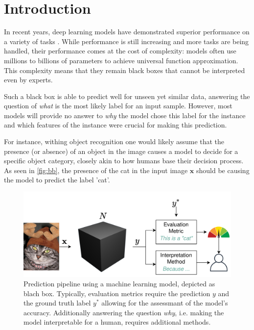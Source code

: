 \section{Introduction}
\label{sec:introduction}

In recent years, deep learning models have demonstrated superior performance on a variety of tasks \cite{ruede2020multi, brinker2019deep, nguyen2020super}. While performance is still increasing and more tasks are being handled, their performance comes at the cost of complexity: models often use millions to billions of parameters to achieve universal function approximation.
This complexity means that they remain black boxes that cannot be interpreted even by experts.

Such a black box is able to predict well for unseen yet similar data, answering the question of \textit{what} is the most likely label for an input sample. 
However, most models will provide no answer to \textit{why} the model chose this label for the instance and which features of the instance were crucial for making this prediction. 

For instance, withing object recognition one would likely assume that the presence (or absence) of an object in the image causes a model to decide for a specific object category, closely akin to how humans base their decision process. As seen in \autoref{fig:bb}, the presence of the cat in the input image $\mathbf{x}$ should be causing the model to predict the label 'cat'.  

\begin{figure}[t]
    \centering
    \includegraphics[width=\linewidth]{figures/bb.png}
    \caption{Prediction pipeline using a machine learning model, depicted as blach box. Typically, evaluation metrics require the prediction $y$ and the ground truth label $y^*$ allowing for the assessmant of the model's accuracy. Additionally answering the question \textit{why}, i.e. making the model interpretable for a human, requires additional methods.}
    \label{fig:bb}
    \vspace{-0.3cm}
\end{figure}

